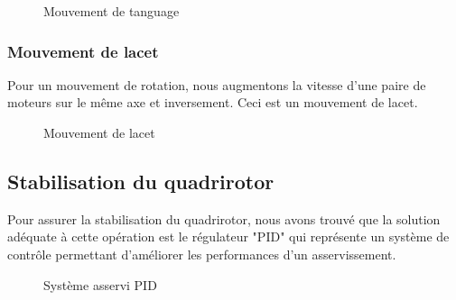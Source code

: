 	
	\begin{figure}[H] 
	\begin{center}
		\centering
	\end{center}
	\caption{Mouvement de tanguage}
	\end{figure}
	
	\subsubsection{Mouvement de lacet}
	Pour un mouvement de rotation, nous augmentons la vitesse d'une paire de moteurs sur le même axe et inversement. Ceci est un mouvement de lacet.
	\begin{figure} [H]
	\begin{center}
	\end{center}
	\caption{Mouvement de lacet}	
\end{figure}
\subsection {Stabilisation du quadrirotor}
Pour assurer la stabilisation du quadrirotor, nous avons trouvé que la solution adéquate à cette opération est le régulateur "PID" qui représente un système de contrôle permettant d’améliorer les performances d'un asservissement\cite{Wikipideab}.
	\begin{figure}[H] 
	\begin{center}
		\centering
	\end{center}
	\caption{Système asservi PID}
\end{figure}

